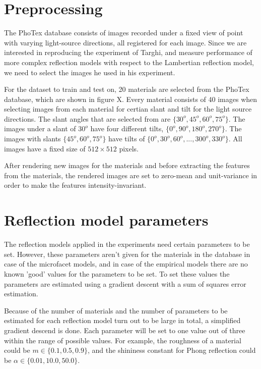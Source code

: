 \hypertarget{experiments}{
}

\section{Preprocessing}\label{sec:preprocessing}
The PhoTex database consists of images recorded under a fixed view of point with varying light-source directions, all registered for each image. Since we are interested in reproducing the experiment of Targhi, and measure performance of more complex reflection models with respect to the Lambertian reflection model, we need to select the images he used in his experiment.

For the dataset to train and test on, 20 materials are selected from the PhoTex database, which are shown in figure X. Every material consists of 40 images when selecting images from each material for certian slant and tilt for the light source directions. The slant angles that are selected from are $\{30^o, 45^o,60^o,75^o\}$. The images under a slant of $30^o$ have four different tilts, $\{0^o, 90^o, 180^o, 270^o\}$. The images with slants $\{45^o,60^o,75^o\}$ have tilts of $\{0^o,30^o,60^o,...,300^o,330^o\}$. All images have a fixed size of $512 \times 512$ pixels.

After rendering new images for the materials and before extracting the features from the materials, the rendered images are set to zero-mean and unit-variance in order to make the features intensity-invariant.

\section{Reflection model parameters}\label{sec:ParameterSetting}
The reflection models applied in the experiments need certain parameters to be set. However, these parameters aren't given for the materials in the database in case of the microfacet models, and in case of the empirical models there are no known 'good' values for the parameters to be set. To set these values the parameters are estimated using a gradient descent with a sum of squares error estimation. 

Because of the number of materials and the number of parameters to be estimated for each reflection model turn out to be large in total, a simplified gradient descend is done. Each parameter will be set to one value out of three within the range of possible values. For example, the roughness of a material could be $m \in \{0.1, 0.5, 0.9\}$, and the shininess constant for Phong reflection could be $\alpha \in \{0.01, 10.0, 50.0\}$. 

